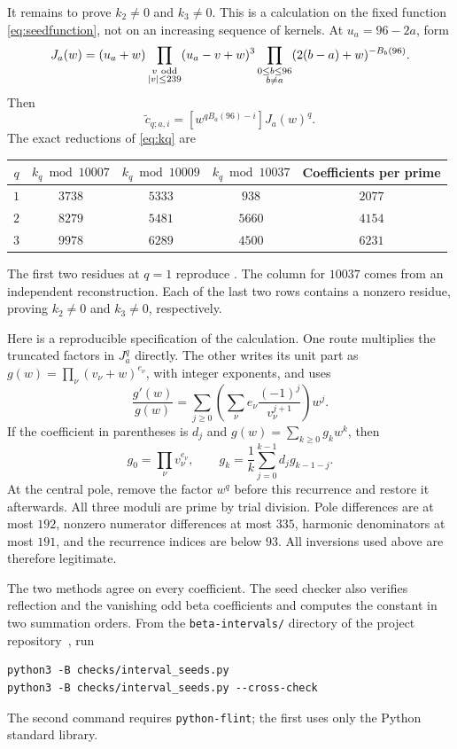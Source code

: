 \documentclass[11pt]{article}
\theoremstyle{remark}
\numberwithin{equation}{section}
\begin{document}
It remains to prove $k_2\ne0$ and $k_3\ne0$. This is a calculation
on the fixed function \eqref{eq:seedfunction}, not on an increasing
sequence of kernels. At $u_a=96-2a$, form
\[
 J_a(w)=(u_a+w)
 \prod_{\substack{v\ {\rm odd}\\|v|\le239}}(u_a-v+w)^3
 \prod_{\substack{0\le b\le96\\b\ne a}}
                       (2(b-a)+w)^{-B_b(96)}.
\]
Then
\[
 \widetilde c_{q;a,i}=[w^{qB_a(96)-i}]J_a(w)^q.
\]
The exact reductions of \eqref{eq:kq} are
\begin{center}
\begin{tabular}{@{}ccccc@{}}
\toprule
$q$ & $k_q\bmod10007$ & $k_q\bmod10009$ & $k_q\bmod10037$
    & Coefficients per prime\\
\midrule
$1$ & $3738$ & $5333$ & $938$ & $2077$\\
$2$ & $8279$ & $5481$ & $5660$ & $4154$\\
$3$ & $9978$ & $6289$ & $4500$ & $6231$\\
\bottomrule
\end{tabular}
\end{center}
The first two residues at $q=1$ reproduce \cite[Section~5]{fifteen}.
The column for $10037$ comes from an independent reconstruction.
Each of the last two rows contains a nonzero residue, proving
$k_2\ne0$ and $k_3\ne0$, respectively.

Here is a reproducible specification of the calculation.
One route multiplies the truncated factors in $J_a^q$ directly.
The other writes its unit part as $g(w)=\prod_\nu(v_\nu+w)^{e_\nu}$,
with integer exponents, and uses
\[
 \frac{g'(w)}{g(w)}
  =\sum_{j\ge0}\left(\sum_\nu
                  e_\nu\frac{(-1)^j}{v_\nu^{j+1}}\right)w^j.
\]
If the coefficient in parentheses is $d_j$ and
$g(w)=\sum_{k\ge0}g_kw^k$, then
\[
 g_0=\prod_\nu v_\nu^{e_\nu},\qquad
 g_k=\frac1k\sum_{j=0}^{k-1}d_jg_{k-1-j}.
\]
At the central pole, remove the factor $w^q$ before this
recurrence and restore it afterwards.
All three moduli are prime by trial division. Pole differences
are at most $192$, nonzero numerator differences at most $335$,
harmonic denominators at most $191$, and the recurrence indices
are below $93$. All inversions used above are therefore legitimate.

The two methods agree on every coefficient. The seed checker also verifies
reflection and the vanishing odd beta coefficients and computes the constant
in two summation orders. From the \texttt{beta-intervals/} directory of the project
repository~\cite{beta4repo}, run
\begin{verbatim}
python3 -B checks/interval_seeds.py
python3 -B checks/interval_seeds.py --cross-check
\end{verbatim}
The second command requires \texttt{python-flint}; the first uses
only the Python standard library.
\end{document}

